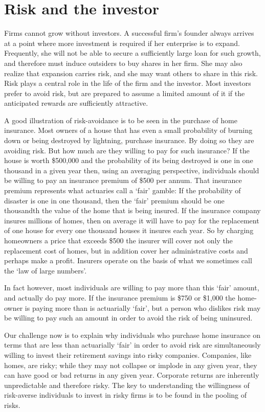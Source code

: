 \section{Risk and the investor}\label{sec:ch7sec3}

Firms cannot grow without investors. A successful firm's founder always
arrives at a point where more investment is required if her enterprise is to
expand. Frequently, she will not be able to secure a sufficiently large loan
for such growth, and therefore must induce outsiders to buy shares in her
firm. She may also realize that expansion carries risk, and she may want
others to share in this risk. Risk plays a central role in the life of the
firm and the investor. Most investors prefer to avoid risk, but are prepared
to assume a limited amount of it if the anticipated rewards are sufficiently
attractive.

A good illustration of risk-avoidance is to be seen in the purchase of home
insurance. Most owners of a house that has even a small probability of
burning down or being destroyed by lightning, purchase insurance. By doing
so they are avoiding risk. But how much are they willing to pay for such
insurance? If the house is worth \$500,000 and the probability of its being
destroyed is one in one thousand in a given year then, using an averaging
perspective, individuals should be willing to pay an insurance premium of
\$500 per annum. That insurance premium represents what actuaries call a
`fair' gamble: If the probability of disaster is one in one thousand, then
the `fair' premium should be one thousandth the value of the home that is
being insured. If the insurance company insures millions of homes, then on
average it will have to pay for the replacement of one house for every one
thousand houses it insures each year. So by charging homeowners a price that
exceeds \$500 the insurer will cover not only the replacement cost of homes,
but in addition cover her administrative costs and perhaps make a profit.
Insurers operate on the basis of what we sometimes call the `law of large
numbers'.

In fact however, most individuals are willing to pay more than this `fair'
amount, and actually do pay more. If the insurance premium is \$750 or
\$1,000 the home-owner is paying more than is actuarially `fair', but a
person who dislikes risk may be willing to pay such an amount in order to
avoid the risk of being uninsured.

Our challenge now is to explain why individuals who purchase home insurance
on terms that are less than actuarially `fair' in order to avoid risk are
simultaneously willing to invest their retirement savings into risky
companies. Companies, like homes, are risky; while they may not collapse or
implode in any given year, they can have good or bad returns in any given
year. Corporate returns are inherently unpredictable and therefore risky.
The key to understanding the willingness of risk-averse individuals to
invest in risky firms is to be found in the pooling of risks.